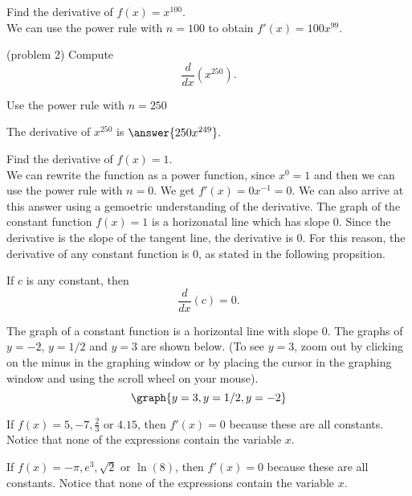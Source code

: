 \documentclass{ximera}
\begin{document}
\begin{example}[example 2]
Find the derivative of $f(x) = x^{100}$.\\
We can use the power rule with $n = 100$ to obtain $f'(x) = 100x^{99}.$
\end{example}

\begin{problem}(problem 2)
Compute
\[
\frac{d}{dx} \left(x^{250}\right).
\]
\begin{hint}
Use the power rule with $n = 250$
\end{hint}
The derivative of $x^{250}$ is $\answer{250x^{249}}.$
\end{problem}



\begin{example}[example 3]
Find the derivative of $f(x) = 1$.\\
We can rewrite the function as a power function, since $x^0 = 1$ and then we can use the power rule with $n=0$. We get $f'(x) = 0x^{-1} = 0$. 
We can also arrive at this answer using a gemoetric understanding of the derivative.
The graph of the constant function $f(x) = 1$ is a horizonatal line which has slope 0. 
Since the derivative is the slope of the tangent line, the derivative is 0.
For this reason, the derivative of any constant function is 0, as stated in the following propsition.
\end{example}

\begin{proposition}
If $c$ is any constant, then
\[
\frac{d}{dx} \left(c\right) = 0.
\]
\end{proposition}

The graph of a constant function is a horizontal line with slope 0.
The graphs of $y = -2$, $y = 1/2$ and $y = 3$ are shown below.
(To see $y=3$, zoom out by clicking on the minus in the graphing window or 
by placing the cursor in the graphing window and using the scroll wheel on your mouse).
\[
\graph{y = 3, y = 1/2, y = -2}
\]



\begin{example}[example 4]
If $f(x) = 5, -7, \frac23$ or $4.15$, then $f'(x) = 0$ 
because these are all constants. Notice that none of the expressions contain the variable $x$.
\end{example}



\begin{example}[example 5]
If $f(x) = -\pi, e^3, \sqrt 2$ or $\ln(8)$, then $f'(x) = 0$ 
because these are all constants. Notice that none of the expressions contain the variable $x$.
\end{example}
\end{document}

